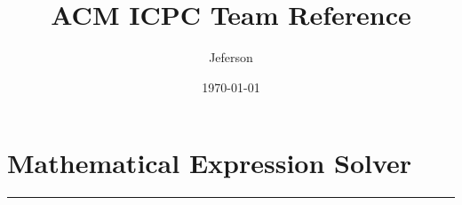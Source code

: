 \documentclass[landscape,twocolumn,a4paper]{article}
\author{Jeferson}
\title{ACM ICPC Team Reference}
\date{\today}
\newcommand{\Csourcefile}[1]{}
\newcommand{\CODE}[2]{\section*{#1} \Csourcefile{#2} \rule{4cm}{0.25pt} \newpage }
\begin{document}
\scriptsize{}
\maketitle{}
\thispagestyle{fancy}

\CODE{Mathematical Expression Solver} {solver}
\end{document}
